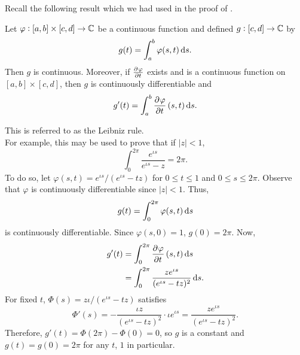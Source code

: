 	Recall the following result which we had used in the proof of .

	\begin{ftheo}
		Let $\varphi : [a,b] \times [c,d] \to \mathbb{C}$ be a continuous function and defined $g : [c,d] \to \mathbb{C}$ by
		\[ g(t) = \int_a^b \varphi(s,t) \dif s. \]
		Then $g$ is continuous. Moreover, if $\pd{\varphi}{t}$ exists and is a continuous function on $[a,b] \times [c,d]$, then $g$ is continuously differentiable and
		\[ g'(t) = \int_a^b \dpd{\varphi}{t}(s,t) \dif s. \]
	\end{ftheo}

	This is referred to as the Leibniz rule.\\

	For example, this may be used to prove that if $|z| < 1$,
	\[ \int_0^{2\pi} \frac{e^{\iota s}}{e^{\iota s} - z} = 2 \pi. \]
	To do so, let $\varphi(s,t) = e^{\iota s} / (e^{\iota s} - tz)$ for $0 \le t \le 1$ and $0 \le s \le 2\pi$. Observe that $\varphi$ is continuously differentiable since $|z| < 1$. Thus,
	\[ g(t) = \int_0^{2\pi} \varphi(s,t) \dif s \]
	is continuously differentiable. Since $\varphi(s,0) = 1$, $g(0) = 2\pi$. Now,
	\begin{align*}
		g'(t) &= \int_0^{2\pi} \dpd{\varphi}{t}(s,t) \dif s \\
			&= \int_0^{2\pi} \frac{ze^{\iota s}}{(e^{\iota s} - tz)^2} \dif s.
	\end{align*}
	For fixed $t$, $\Phi(s) = z\iota/(e^{\iota s} - tz)$ satisfies
	\[ \Phi'(s) = -\frac{\iota z}{(e^{\iota s} - tz)^{2}} \cdot \iota e^{\iota s} = \frac{ze^{\iota s}}{(e^{\iota s} - tz)^2}. \]
	Therefore, $g'(t) = \Phi(2\pi) - \Phi(0) = 0$, so $g$ is a constant and $g(t) = g(0) = 2\pi$ for any $t$, $1$ in particular.

